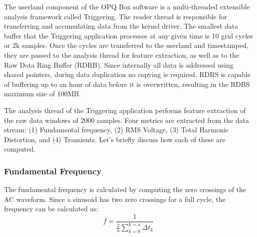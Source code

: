 The userland component of the OPQ Box software is a multi-threaded extensible analysis framework called Triggering.
The reader thread is responsible for transferring and accumulating data from the kernel driver.
The smallest data buffer that the Triggering application processes at any given time is 10 grid cycles or 2k samples.
Once the cycles are transferred to the userland and timestamped, they are passed to the analysis thread for feature extraction, as well as to the Raw Data Ring Buffer (RDRB).
Since internally all data is addressed using shared pointers, during data duplication no copying is required.
RDRS is capable of buffering up to an hour of data before it is overwritten, resulting in the RDBS maximum size of 100MB.

The analysis thread of the Triggering application performs feature extraction of the raw data windows of 2000 samples.
Four metrics are extracted from the data stream: (1) Fundamental frequency, (2) RMS Voltage, (3) Total Harmonic Distortion, and (4) Transients. Let's briefly discuss how each of these are computed.

\subsubsection{Fundamental Frequency}\label{subsec:fundamental-frequency}

The fundamental frequency is calculated by computing the zero crossings of the AC waveform.
Since a sinusoid has two zero crossings for a full cycle, the frequency can be calculated as:
\begin{equation} \label{eq:1}
 f = \frac{1}{\frac{2}{n}\sum\limits_{k=0}^{k=n}{\Delta t_{k}}}
\end{equation}

